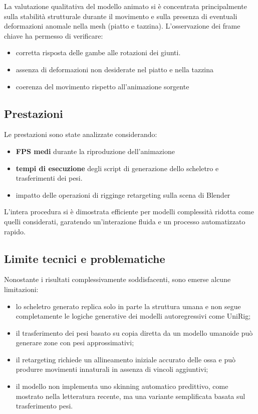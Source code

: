 La valutazione qualitativa del modello animato si è concentrata principalmente sulla stabilità strutturale durante il movimento e sulla presenza di eventuali deformazioni anomale nella mesh (piatto e tazzina).
L'osservazione dei frame chiave ha permesso di verificare:

\begin{itemize}
    \item corretta risposta delle gambe alle rotazioni dei giunti.
    \item assenza di deformazioni non desiderate nel piatto e nella tazzina
    \item coerenza del movimento rispetto all'animazione sorgente
\end{itemize}

\subsection{Prestazioni}

Le prestazioni sono state analizzate considerando:

\begin{itemize}
    \item \textbf{FPS medi} durante la riproduzione dell'animazione
    \item \textbf{tempi di esecuzione} degli script di generazione dello scheletro e trasferimenti dei pesi.
    \item impatto delle operazioni di rigginge retargeting sulla scena di Blender
\end{itemize}
    
L'intera procedura si è dimostrata efficiente per modelli complessità ridotta come quelli considerati, garatendo un'interazione fluida e un processo automatizzato rapido.

\subsection{Limite tecnici e problematiche}

Nonostante i risultati complessivamente soddisfacenti, sono emerse alcune limitazioni:

\begin{itemize}
    \item lo scheletro generato replica solo in parte la struttura umana e non segue completamente le logiche generative dei modelli autoregressivi come UniRig;
    \item il trasferimento dei pesi basato su copia diretta da un modello umanoide può generare zone con pesi approssimativi;
    \item il retargeting richiede un allineamento iniziale accurato delle ossa e può produrre movimenti innaturali in assenza di vincoli aggiuntivi;
    \item il modello non implementa uno skinning automatico predittivo, come mostrato nella letteratura recente, ma una variante semplificata basata sul trasferimento pesi.
\end{itemize}






    

